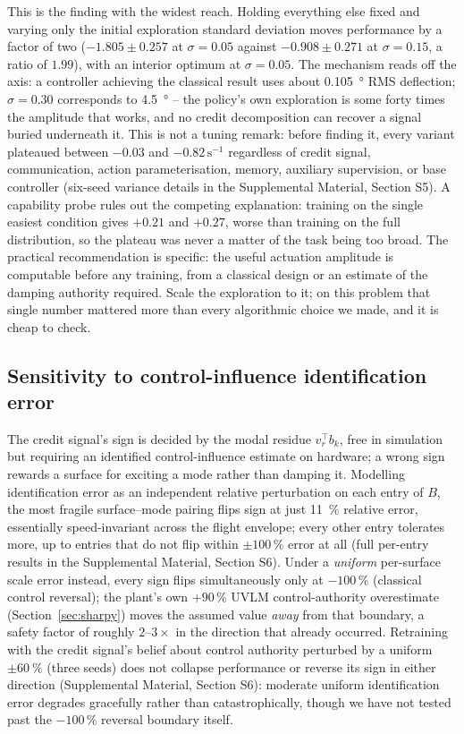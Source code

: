 \documentclass[preprint,11pt]{elsarticle}
\begin{document}
This is the finding with the widest reach. Holding everything else fixed
and varying only the initial exploration standard deviation moves
performance by a factor of two ($-1.805\pm0.257$ at $\sigma=0.05$ against
$-0.908\pm0.271$ at $\sigma=0.15$, a ratio of $1.99$), with an interior
optimum at $\sigma=0.05$. The mechanism reads off the axis: a controller
achieving the classical result uses about \SI{0.105}{\degree} RMS
deflection; $\sigma=0.30$ corresponds to \SI{4.5}{\degree} -- the policy's
own exploration is some forty times the amplitude that works, and no
credit decomposition can recover a signal buried underneath it. This is
not a tuning remark: before finding it, every variant plateaued between
$-0.03$ and $-0.82\,\mathrm{s}^{-1}$ regardless of credit signal,
communication, action parameterisation, memory, auxiliary supervision, or
base controller (six-seed variance details in the Supplemental Material,
Section S5). A capability probe rules out the competing explanation:
training on the single easiest condition gives $+0.21$ and $+0.27$, worse
than training on the full distribution, so the plateau was never a matter
of the task being too broad. The practical recommendation is specific: the
useful actuation amplitude is computable before any training, from a
classical design or an estimate of the damping authority required. Scale
the exploration to it; on this problem that single number mattered more
than every algorithmic choice we made, and it is cheap to check.

\subsection{Sensitivity to control-influence identification error}
\label{sec:credit-sensitivity}

The credit signal's sign is decided by the modal residue $v_r^{\top} b_k$,
free in simulation but requiring an identified control-influence estimate
on hardware; a wrong sign rewards a surface for exciting a mode rather
than damping it. Modelling identification error as an independent relative
perturbation on each entry of $B$, the most fragile surface--mode pairing
flips sign at just \SI{11}{\percent} relative error, essentially
speed-invariant across the flight envelope; every other entry tolerates
more, up to entries that do not flip within $\pm100\,\%$ error at all
(full per-entry results in the Supplemental Material, Section S6). Under a
\emph{uniform} per-surface scale error instead, every sign flips
simultaneously only at $-100\,\%$ (classical control reversal); the
plant's own $+90\,\%$ UVLM control-authority overestimate
(Section~\ref{sec:sharpy}) moves the assumed value \emph{away} from that
boundary, a safety factor of roughly $2$--$3\times$ in the direction that
already occurred. Retraining with the credit signal's belief about control
authority perturbed by a uniform $\pm\SI{60}{\percent}$ (three seeds) does
not collapse performance or reverse its sign in either direction
(Supplemental Material, Section S6): moderate uniform identification error
degrades gracefully rather than catastrophically, though we have not
tested past the $-100\,\%$ reversal boundary itself.
\end{document}
